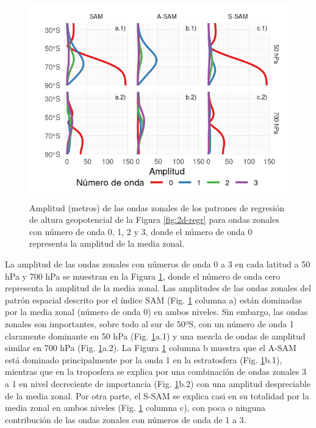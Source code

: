 \documentclass[12pt,oneside,a4paper]{reedthesis}
\begin{document}
\begin{figure}

{\centering \includegraphics{figures/30-sam/wave-amplitude-1} 

}

\caption{Amplitud (metros) de las ondas zonales de los patrones de regresión de altura geopotencial de la Figura \ref{fig:2d-regr} para ondas zonales con número de onda 0, 1, 2 y 3, donde el número de onda 0 representa la amplitud de la media zonal.}\label{fig:wave-amplitude}
\end{figure}

La amplitud de las ondas zonales con números de onda 0 a 3 en cada latitud a 50 hPa y 700 hPa se muestran en la Figura \ref{fig:wave-amplitude}, donde el número de onda cero representa la amplitud de la media zonal.
Las amplitudes de las ondas zonales del patrón espacial descrito por el índice SAM (Fig. \ref{fig:wave-amplitude} columna a) están dominadas por la media zonal (número de onda 0) en ambos niveles.
Sin embargo, las ondas zonales son importantes, sobre todo al sur de 50ºS, con un número de onda 1 claramente dominante en 50 hPa (Fig. \ref{fig:wave-amplitude}a.1) y una mezcla de ondas de amplitud similar en 700 hPa (Fig. \ref{fig:wave-amplitude}a.2).
La Figura \ref{fig:wave-amplitude} columna b muestra que el A-SAM está dominado principalmente por la onda 1 en la estratosfera (Fig. \ref{fig:wave-amplitude}b.1), mientras que en la troposfera se explica por una combinación de ondas zonales 3 a 1 en nivel decreciente de importancia (Fig. \ref{fig:wave-amplitude}b.2) con una amplitud despreciable de la media zonal.
Por otra parte, el S-SAM se explica casi en su totalidad por la media zonal en ambos niveles (Fig. \ref{fig:wave-amplitude} columna c), con poca o ninguna contribución de las ondas zonales con números de onda de 1 a 3.
\end{document}
